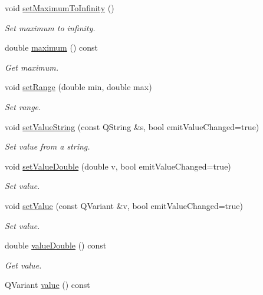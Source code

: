 \begin{DoxyCompactItemize}
void \hyperlink{classmdt_double_edit_a4fa7bf1b30590223ec825079e36ab375}{set\-Maximum\-To\-Infinity} ()
\begin{DoxyCompactList}\small\item\em Set maximum to infinity. \end{DoxyCompactList}\item 
double \hyperlink{classmdt_double_edit_a59be46e6f7d976a3a3373b76e03152e9}{maximum} () const 
\begin{DoxyCompactList}\small\item\em Get maximum. \end{DoxyCompactList}\item 
void \hyperlink{classmdt_double_edit_a37e6542c3f29a5db083a3760409d47dc}{set\-Range} (double min, double max)
\begin{DoxyCompactList}\small\item\em Set range. \end{DoxyCompactList}\item 
void \hyperlink{classmdt_double_edit_a6b7d233d74dbb7f587d062aa5ff1abdb}{set\-Value\-String} (const Q\-String \&s, bool emit\-Value\-Changed=true)
\begin{DoxyCompactList}\small\item\em Set value from a string. \end{DoxyCompactList}\item 
void \hyperlink{classmdt_double_edit_ac3c1a762df3ffd84e736f9ce1cbeb702}{set\-Value\-Double} (double v, bool emit\-Value\-Changed=true)
\begin{DoxyCompactList}\small\item\em Set value. \end{DoxyCompactList}\item 
void \hyperlink{classmdt_double_edit_a077b00c2e4ae13e66a2d903a42c0be52}{set\-Value} (const Q\-Variant \&v, bool emit\-Value\-Changed=true)
\begin{DoxyCompactList}\small\item\em Set value. \end{DoxyCompactList}\item 
double \hyperlink{classmdt_double_edit_a2ffc11c9f013ff65b49642703146ec01}{value\-Double} () const 
\begin{DoxyCompactList}\small\item\em Get value. \end{DoxyCompactList}\item 
Q\-Variant \hyperlink{classmdt_double_edit_a6987992984d3cfab5f96467c2b98e511}{value} () const 

\end{DoxyCompactItemize}
